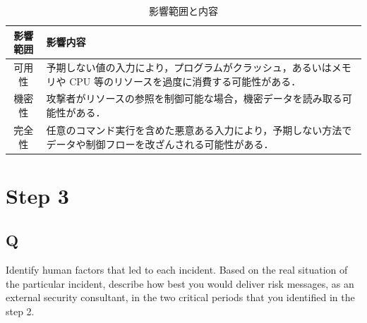 \documentclass[uplatex]{jsarticle}
\begin{document}
\begin{table}[htbp]
    \centering
    \caption{影響範囲と内容}
    \label{tab:influence}
    \begin{tabular}{|c|p{10cm}|}
    \hline
    影響範囲 & 影響内容 \\ \hline
    可用性 & 予期しない値の入力により，プログラムがクラッシュ，あるいはメモリや CPU 等のリソースを過度に消費する可能性がある． \\ \hline
    機密性 & 攻撃者がリソースの参照を制御可能な場合，機密データを読み取る可能性がある． \\ \hline
    完全性 & 任意のコマンド実行を含めた悪意ある入力により，予期しない方法でデータや制御フローを改ざんされる可能性がある． \\ \hline
    \end{tabular}
\end{table}

\section*{Step 3}
\subsection*{Q}
Identify human factors that led to each incident. Based on the real situation of the particular incident, describe how best you would deliver risk messages, as an external security consultant, in the two critical periods that you identified in the step 2.
\end{document}
